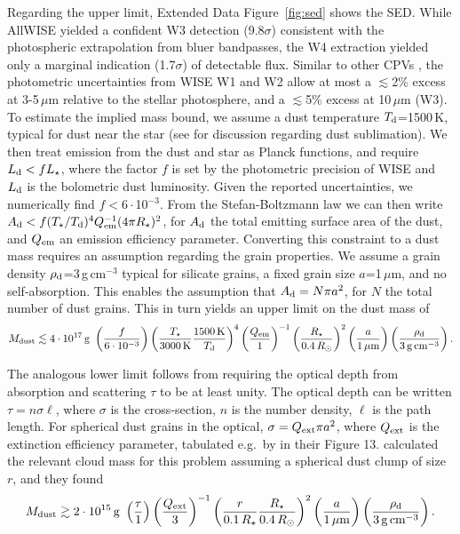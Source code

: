 \documentclass{nature3}
\begin{document}
\begin{methods}
Regarding the upper limit, Extended Data Figure~\ref{fig:sed} shows the SED.  While
AllWISE \cite{Cutri2014} yielded a confident W3 detection
(9.8$\sigma$) consistent with the photospheric extrapolation from bluer
bandpasses, the W4 extraction yielded only a marginal indication
(1.7$\sigma$) of detectable flux.  Similar to other CPVs
\cite{Stauffer2017,Bouma2024}, the photometric uncertainties from WISE
W1 and W2 allow at most a $\lesssim$2\% excess at 3-5\,$\mu$m relative
to the stellar photosphere, and a $\lesssim$5\% excess at 10\,$\mu$m
(W3).  To estimate the implied mass bound, we assume a dust
temperature $T_{\rm d}$=1500\,K, typical for dust near the star (see
\cite{Zhan2019} for discussion regarding dust sublimation).  We then
treat emission from the dust and star as Planck functions, and require
$L_{\rm d} < f L_\star$, where the factor $f$ is set by the
photometric precision of WISE and $L_{\rm d}$ is the bolometric dust
luminosity.  Given the reported uncertainties, we numerically find
$f<6\cdot$10$^{-3}$.  From the Stefan-Boltzmann law we can then write
$A_{\rm d} < f (T_\star / T_{\rm d})^4 Q_{\rm em}^{-1} (4\pi
R_\star)^2$, for $A_{\rm d}$ the total emitting surface area of the
dust, and $Q_{\rm em}$ an emission efficiency parameter.  Converting
this constraint to a dust mass requires an assumption regarding the
grain properties.  We assume a grain density $\rho_{\rm
d}$=3\,g\,cm$^{-3}$ typical for silicate grains, a fixed grain size
$a$=1\,$\mu$m, and no self-absorption.  This enables the assumption
that $A_{\rm d} = N \pi a^2$, for $N$ the total number of dust grains.
This in turn yields an upper limit on the dust mass of
\begin{equation}
  M_{\rm dust} \lesssim 4 \cdot 10^{17}\, {\rm g}\ 
  \left( \frac{f}{6\cdot10^{-3}} \right)
  \left( \frac{T_\star}{3000\,{\rm K}} \frac{1500\,{\rm K}}{T_{\rm d}} \right)^4
  \left( \frac{Q_{\rm em}}{1} \right)^{-1}
  \left( \frac{R_\star}{0.4\,R_\odot} \right)^2
  \left( \frac{a}{1\,\mathrm{\mu m}} \right)
  \left( \frac{\rho_{\rm d}}{3\,\mathrm{g\,cm^{-3}}} \right).
\end{equation}

The analogous lower limit follows from requiring the optical depth
from absorption and scattering $\tau$ to be at least unity.  The
optical depth can be written $\tau = n \sigma \ell$, where
$\sigma$ is the cross-section, $n$ is the number density, $\ell$ is
the path length.  For spherical dust
grains in the optical, $\sigma = Q_{\rm ext} \pi a^2$, where $Q_{\rm
ext}$ is the extinction efficiency parameter, tabulated e.g.~by
\cite{Croll2014} in their Figure 13.  \cite{Sanderson2023} calculated
the relevant cloud mass for this problem assuming a spherical dust
clump of size $r$, and they found
\begin{equation}
  M_{\rm dust} \gtrsim 2 \cdot 10^{15}\, {\rm g}\ 
  \left( \frac{\tau}{1} \right)
  \left( \frac{Q_{\rm ext}}{3} \right)^{-1}
  \left( \frac{r}{0.1\,R_\star} \frac{R_\star}{0.4\,R_\odot} \right)^2
  \left( \frac{a}{1\,\mathrm{\mu m}} \right)
  \left( \frac{\rho_{\rm d}}{3\,\mathrm{g\,cm^{-3}}} \right).
\end{equation}


\end{methods}
\end{document}
